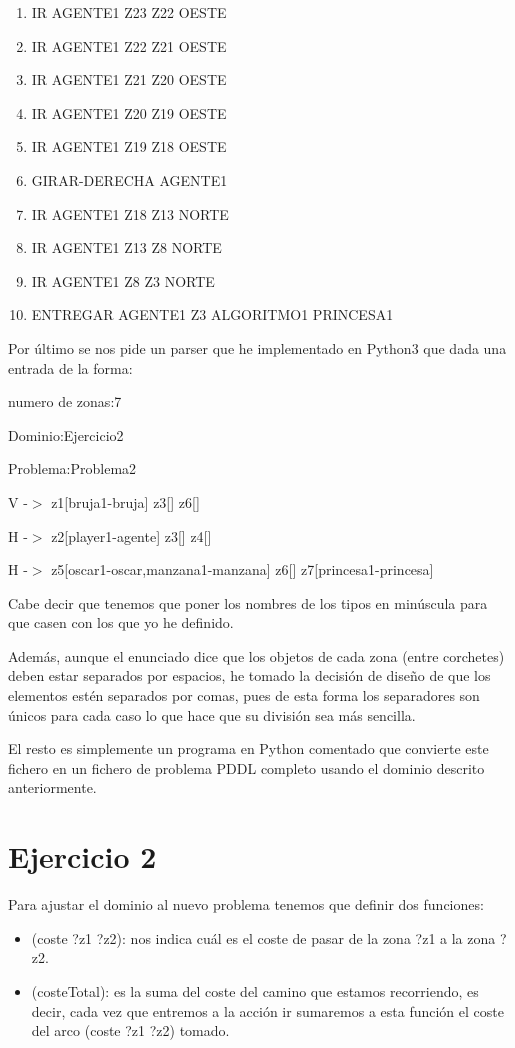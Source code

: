 \documentclass[12pt,a4paper]{article}
\begin{document}
\begin{enumerate}
	\item IR AGENTE1 Z23 Z22 OESTE
	\item IR AGENTE1 Z22 Z21 OESTE
	\item IR AGENTE1 Z21 Z20 OESTE
	\item IR AGENTE1 Z20 Z19 OESTE
	\item IR AGENTE1 Z19 Z18 OESTE
	\item GIRAR-DERECHA AGENTE1
	\item IR AGENTE1 Z18 Z13 NORTE
	\item IR AGENTE1 Z13 Z8 NORTE
	\item IR AGENTE1 Z8 Z3 NORTE
	\item ENTREGAR AGENTE1 Z3 ALGORITMO1 PRINCESA1
\end{enumerate}

Por último se nos pide un parser que he implementado en Python3 que dada una entrada de la forma:

numero de zonas:7

Dominio:Ejercicio2

Problema:Problema2

V -$>$ z1[bruja1-bruja] z3[] z6[]

H -$>$ z2[player1-agente] z3[] z4[]

H -$>$ z5[oscar1-oscar,manzana1-manzana] z6[] z7[princesa1-princesa]

Cabe decir que tenemos que poner los nombres de los tipos en minúscula para que casen con los que yo he definido.

Además, aunque el enunciado dice que los objetos de cada zona (entre corchetes) deben estar separados por espacios, he tomado la decisión de diseño de que los elementos estén separados por comas, pues de  esta forma los separadores son únicos para cada caso lo que hace que su división sea más sencilla.

El resto es simplemente un programa en Python comentado que convierte este fichero en un fichero de problema PDDL completo usando el dominio descrito anteriormente.

\section{Ejercicio 2}

Para ajustar el dominio al nuevo problema tenemos que definir dos funciones:

\begin{itemize}
	\item (coste ?z1 ?z2): nos indica cuál es el coste de pasar de la zona ?z1 a la zona ?z2.
	\item (costeTotal): es la suma del coste del camino que estamos recorriendo, es decir, cada vez que entremos a la acción ir sumaremos a esta función el coste del arco (coste ?z1 ?z2) tomado.
\end{itemize}
\end{document}
